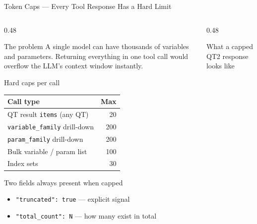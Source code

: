 \documentclass[aspectratio=169,10pt]{beamer}
\begin{document}
\begin{frame}[t]{Token Caps — Every Tool Response Has a Hard Limit}
\vspace{2pt}
\begin{columns}[T]
  \begin{column}{0.48\textwidth}
    \vspace{4pt}
    \begin{alertblock}{The problem}
      \small A single model can have thousands of variables and
      parameters. Returning everything in one tool call would
      overflow the LLM's context window instantly.
    \end{alertblock}
    \vspace{6pt}
    \begin{block}{Hard caps per call}
      \renewcommand{\arraystretch}{1.4}
      \small
      \begin{tabular}{@{}p{5.2cm}r@{}}
        \toprule
        \textbf{Call type} & \textbf{Max} \\
        \midrule
        QT result \texttt{items} (any QT)  & 20  \\
        \texttt{variable\_family} drill-down & 200 \\
        \texttt{param\_family} drill-down    & 200 \\
        Bulk variable / param list          & 100 \\
        Index sets                          & 30  \\
        \bottomrule
      \end{tabular}
    \end{block}
    \vspace{6pt}
    \begin{block}{Two fields always present when capped}
      \begin{itemize}\setlength\itemsep{4pt}
        \item \texttt{"truncated": true} \textcolor{mgray}{—} explicit signal
        \item \texttt{"total\_count": N} \textcolor{mgray}{—} how many exist in total
      \end{itemize}
    \end{block}
  \end{column}
  \begin{column}{0.48\textwidth}
    \vspace{4pt}
    \begin{block}{What a capped QT2 response looks like}
      \texttt{\scriptsize
}
\end{block}
\end{column}
\end{columns}
\end{frame}
\end{document}
